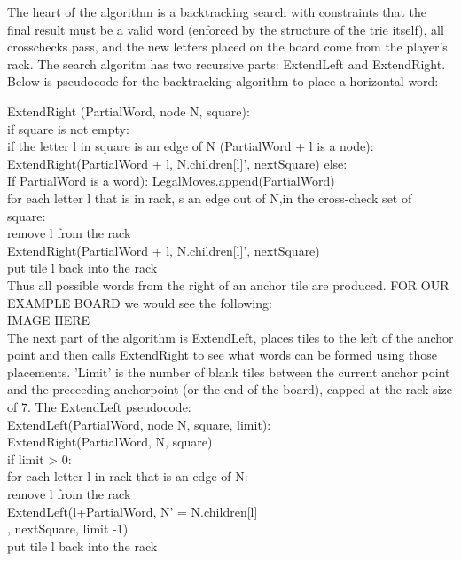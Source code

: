 \documentclass[12pt]{article}
\begin{document}
The heart of the algorithm is a backtracking search with constraints
that the final result must be a valid word (enforced by the structure
of the trie itself), all crosschecks pass, and the new letters placed
on the board come from the player's rack. The search algoritm has two
recursive parts: ExtendLeft and ExtendRight. Below is pseudocode for
the backtracking algorithm to place a horizontal word:

	ExtendRight (PartialWord, node N, square):\\
		if square is not empty:\\
			if the letter l in square is an edge of N (PartialWord + l is a node):\\
				ExtendRight(PartialWord + l, N.children[l]', nextSquare)
		else:\\
			If PartialWord is a word): LegalMoves.append(PartialWord)\\
			for each letter l that is in rack, s an edge out of N,in the cross-check set of square:\\
					remove l from the rack\\
					ExtendRight(PartialWord + l, N.children[l]', nextSquare)\\
					put tile l back into the rack\\

Thus all possible words from the right of an anchor tile are produced. FOR OUR EXAMPLE BOARD we would see the following: \\

IMAGE HERE\\

The next part of the algorithm is ExtendLeft, places tiles to the left
of the anchor point and then calls ExtendRight to see what words can
be formed using those placements. 'Limit' is the number of blank tiles
between the current anchor point and the preceeding anchorpoint (or the end of the board), capped at the rack size of 7. The ExtendLeft pseudocode: \\

	ExtendLeft(PartialWord, node N, square, limit):\\
		ExtendRight(PartialWord, N, square)\\
		if limit > 0: \\
			for each letter l in rack that is an edge of N: \\
					remove l from the rack\\
					ExtendLeft(l+PartialWord, N' = N.children[l]\\, nextSquare, limit -1)\\
					put tile l back into the rack\\
			
\end{document}
